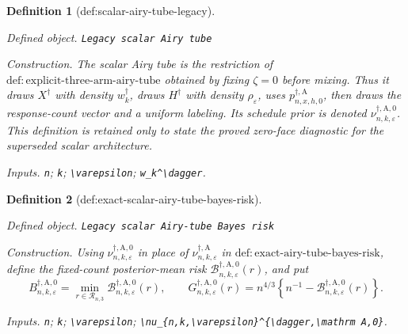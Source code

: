 \documentclass{article}
\newtheorem{definition}{Definition}
\begin{document}
\begin{definition}[def:scalar-airy-tube-legacy]\label{def:scalar-airy-tube-legacy}
\par\smallskip\noindent\emph{Defined object.} \texttt{Legacy scalar Airy tube}
\par\smallskip\noindent\emph{Construction.} The scalar Airy tube is the restriction of \(\mathrm{def:explicit\text{-}three\text{-}arm\text{-}airy\text{-}tube}\) obtained by fixing \(\zeta=0\) before mixing.  Thus it draws \(X^\dagger\) with density \(w_k^\dagger\), draws \(H^\dagger\) with density \(\rho_\varepsilon\), uses \(p_{n,x,h,0}^{\dagger,\mathrm A}\), then draws the response-count vector and a uniform labeling.  Its schedule prior is denoted \(\nu_{n,k,\varepsilon}^{\dagger,\mathrm A,0}\).  This definition is retained only to state the proved zero-face diagnostic for the superseded scalar architecture.
\par\smallskip\noindent\emph{Inputs.} \texttt{n}; \texttt{k}; \texttt{\textbackslash{}\allowbreak{}varepsilon}; \texttt{w\_\allowbreak{}k\textasciicircum{}\textbackslash{}\allowbreak{}dagger}.
\end{definition}

\begin{definition}[def:exact-scalar-airy-tube-bayes-risk]\label{def:exact-scalar-airy-tube-bayes-risk}
\par\smallskip\noindent\emph{Defined object.} \texttt{Legacy scalar Airy-\allowbreak{}tube Bayes risk}
\par\smallskip\noindent\emph{Construction.} Using \(\nu_{n,k,\varepsilon}^{\dagger,\mathrm A,0}\) in place of \(\nu_{n,k,\varepsilon}^{\dagger,\mathrm A}\) in \(\mathrm{def:exact\text{-}airy\text{-}tube\text{-}bayes\text{-}risk}\), define the fixed-count posterior-mean risk \(\mathcal B_{n,k,\varepsilon}^{\dagger,\mathrm A,0}(r)\), and put
\[
B_{n,k,\varepsilon}^{\dagger,\mathrm A,0}
=\min_{r\in\mathcal R_{n,3}}
\mathcal B_{n,k,\varepsilon}^{\dagger,\mathrm A,0}(r),
\qquad
G_{n,k,\varepsilon}^{\dagger,\mathrm A,0}(r)
=n^{4/3}\left\{n^{-1}-
\mathcal B_{n,k,\varepsilon}^{\dagger,\mathrm A,0}(r)\right\}.
\]
\par\smallskip\noindent\emph{Inputs.} \texttt{n}; \texttt{k}; \texttt{\textbackslash{}\allowbreak{}varepsilon}; \texttt{\textbackslash{}\allowbreak{}nu\_\allowbreak{}\{n,\allowbreak{}k,\allowbreak{}\textbackslash{}\allowbreak{}varepsilon\}\allowbreak{}\textasciicircum{}\{\textbackslash{}\allowbreak{}dagger,\allowbreak{}\textbackslash{}\allowbreak{}mathrm A,\allowbreak{}0\}\allowbreak{}}.
\end{definition}
\end{document}
